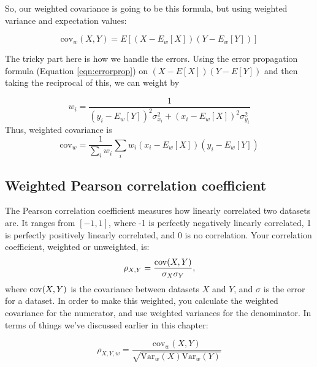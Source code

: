 So, our weighted covariance is going to be this formula, but using weighted variance and expectation values:

\begin{equation}
    \mathrm{cov}_{w}(X,Y) = E[(X-E_{w}[X])(Y-E_{w}[Y])]
\end{equation}

The tricky part here is how we handle the errors. Using the error propagation formula (Equation \ref{eqn:errorprop}) on $(X-E[X])(Y-E[Y])$ and then taking the reciprocal of this, we can weight by 

\begin{equation}
    w_{i} = \frac{1}{(y_{i}-E_{w}[Y])^{2}\sigma_{x_{i}}^{2} + (x_{i}-E_{w}[X])^{2}\sigma_{y_{i}}^{2}}
\end{equation}
Thus, weighted covariance is
\begin{equation}
    \mathrm{cov}_{w} = \frac{1}{\sum_{i}w_{i}}\sum_{i}w_{i}(x_{i}-E_{w}[X])(y_{i}-E_{w}[Y])
\end{equation}

\subsection{Weighted Pearson correlation coefficient}
The Pearson correlation coefficient measures how linearly correlated two datasets are. It ranges from $[-1,1]$, where -1 is perfectly negatively linearly correlated, 1 is perfectly positively linearly correlated, and 0 is no correlation. Your correlation coefficient, weighted or unweighted, is:
\begin{equation}
\label{eqn:corrcoeff}
    \rho_{X,Y} = \frac{\mathrm{cov}(X,Y)}{\sigma_{X}\sigma_{Y}},
\end{equation}
where $\mathrm{cov}(X,Y)$ is the covariance between datasets $X$ and $Y$, and $\sigma$ is the error for a dataset. In order to make this weighted, you calculate the weighted covariance for the numerator, and use weighted variances for the denominator. In terms of things we've discussed earlier in this chapter:

\begin{equation}
    \rho_{X,Y,w} = \frac{\mathrm{cov}_{w}(X,Y)}{\sqrt{\mathrm{Var}_{w}(X)\mathrm{Var}_{w}(Y)}}
\end{equation}

